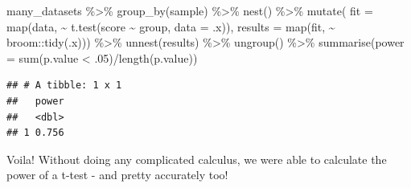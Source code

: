 \documentclass[
]{book}
\newenvironment{Shaded}{\begin{snugshade}}{\end{snugshade}}
\newcommand{\AttributeTok}[1]{\textcolor[rgb]{0.77,0.63,0.00}{#1}}
\newcommand{\DecValTok}[1]{\textcolor[rgb]{0.00,0.00,0.81}{#1}}
\newcommand{\FunctionTok}[1]{\textcolor[rgb]{0.00,0.00,0.00}{#1}}
\newcommand{\NormalTok}[1]{#1}
\newcommand{\SpecialCharTok}[1]{\textcolor[rgb]{0.00,0.00,0.00}{#1}}
\begin{document}
\begin{Shaded}
\begin{Highlighting}[]
\NormalTok{many\_datasets }\SpecialCharTok{\%\textgreater{}\%}
  \FunctionTok{group\_by}\NormalTok{(sample) }\SpecialCharTok{\%\textgreater{}\%} 
  \FunctionTok{nest}\NormalTok{() }\SpecialCharTok{\%\textgreater{}\%} 
  \FunctionTok{mutate}\NormalTok{(}
    \AttributeTok{fit =} \FunctionTok{map}\NormalTok{(data, }\SpecialCharTok{\textasciitilde{}} \FunctionTok{t.test}\NormalTok{(score }\SpecialCharTok{\textasciitilde{}}\NormalTok{ group, }\AttributeTok{data =}\NormalTok{ .x)),}
    \AttributeTok{results =} \FunctionTok{map}\NormalTok{(fit, }\SpecialCharTok{\textasciitilde{}}\NormalTok{ broom}\SpecialCharTok{::}\FunctionTok{tidy}\NormalTok{(.x))) }\SpecialCharTok{\%\textgreater{}\%} 
  \FunctionTok{unnest}\NormalTok{(results) }\SpecialCharTok{\%\textgreater{}\%} 
  \FunctionTok{ungroup}\NormalTok{() }\SpecialCharTok{\%\textgreater{}\%} 
  \FunctionTok{summarise}\NormalTok{(}\AttributeTok{power =} \FunctionTok{sum}\NormalTok{(p.value }\SpecialCharTok{\textless{}}\NormalTok{ .}\DecValTok{05}\NormalTok{)}\SpecialCharTok{/}\FunctionTok{length}\NormalTok{(p.value))}
\end{Highlighting}
\end{Shaded}

\begin{verbatim}
## # A tibble: 1 x 1
##   power
##   <dbl>
## 1 0.756
\end{verbatim}

Voila! Without doing any complicated calculus, we were able to calculate the power of a t-test - and pretty accurately too!

  
\end{document}

